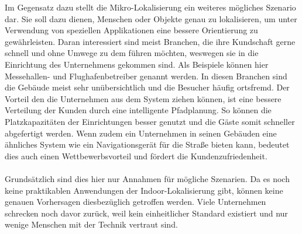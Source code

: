 Im Gegensatz dazu stellt die Mikro-Lokalisierung ein weiteres mögliches Szenario dar. Sie soll dazu dienen, Menschen oder Objekte genau zu lokalisieren, um unter Verwendung von speziellen Applikationen eine bessere Orientierung zu gewährleisten. Daran interessiert sind meist Branchen, die ihre Kundschaft gerne schnell und ohne Umwege zu dem führen möchten, weswegen sie in die Einrichtung des Unternehmens gekommen sind. Als Beispiele können hier Messehallen- und Flughafenbetreiber genannt werden. In diesen Branchen sind die Gebäude meist sehr unübersichtlich und die Besucher häufig ortsfremd. Der Vorteil den die Unternehmen aus dem System ziehen können, ist eine bessere Verteilung der Kunden durch eine intelligente Pfadplanung. So können die Platzkapazitäten der Einrichtungen besser genutzt und die Gäste somit schneller abgefertigt werden. Wenn zudem ein Unternehmen in seinen Gebäuden eine ähnliches System wie ein Navigationsgerät für die Straße bieten kann, bedeutet dies auch einen Wettbewerbsvorteil und fördert die Kundenzufriedenheit. \\ \\
Grundsätzlich sind dies hier nur Annahmen für mögliche Szenarien. Da es noch keine praktikablen Anwendungen der Indoor-Lokalisierung gibt, können keine genauen Vorhersagen diesbezüglich getroffen werden. Viele Unternehmen schrecken noch davor zurück, weil kein einheitlicher Standard existiert und nur wenige Menschen mit der Technik vertraut sind. \par\bigskip 
